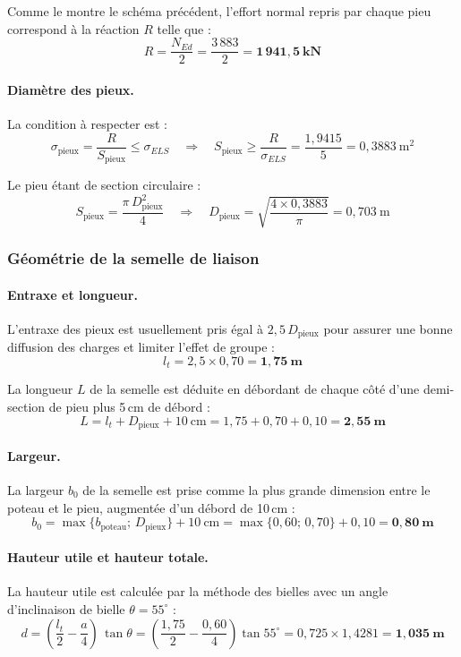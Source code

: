 Comme le montre le schéma précédent, l'effort normal repris par chaque pieu correspond à la réaction $R$ telle que :
\[
  R = \frac{N_{Ed}}{2} = \frac{3\,883}{2} = \mathbf{1\,941{,}5~\text{kN}}
\]

\paragraph{Diamètre des pieux.} La condition à respecter est :
\[
  \sigma_\text{pieux} = \frac{R}{S_\text{pieux}} \leq \sigma_{ELS}
  \quad\Longrightarrow\quad
  S_\text{pieux} \geq \frac{R}{\sigma_{ELS}} = \frac{1{,}9415}{5} = 0{,}3883~\text{m}^2
\]

Le pieu étant de section circulaire :
\[
  S_\text{pieux} = \frac{\pi\,D_\text{pieux}^{2}}{4}
  \quad\Longrightarrow\quad
  D_\text{pieux} = \sqrt{\frac{4 \times 0{,}3883}{\pi}} = 0{,}703~\text{m}
\]


\subsubsection{Géométrie de la semelle de liaison}

\paragraph{Entraxe et longueur.} L'entraxe des pieux est usuellement pris égal à $2{,}5\,D_\text{pieux}$ pour assurer une bonne diffusion des charges et limiter l'effet de groupe :
\[
  l_t = 2{,}5 \times 0{,}70 = \mathbf{1{,}75~\text{m}}
\]

La longueur $L$ de la semelle est déduite en débordant de chaque côté d'une demi-section de pieu plus 5\,cm de débord :
\[
  L = l_t + D_\text{pieux} + 10~\text{cm} = 1{,}75 + 0{,}70 + 0{,}10 = \mathbf{2{,}55~\text{m}}
\]

\paragraph{Largeur.} La largeur $b_0$ de la semelle est prise comme la plus grande dimension entre le poteau et le pieu, augmentée d'un débord de 10\,cm :
\[
  b_0 = \max\{b_\text{poteau} ;\, D_\text{pieux}\} + 10~\text{cm} = \max\{0{,}60 ;\, 0{,}70\} + 0{,}10 = \mathbf{0{,}80~\text{m}}
\]

\paragraph{Hauteur utile et hauteur totale.} La hauteur utile est calculée par la méthode des bielles avec un angle d'inclinaison de bielle $\theta = 55^\circ$ :
\[
  d = \left(\frac{l_t}{2} - \frac{a}{4}\right)\,\tan\theta
    = \left(\frac{1{,}75}{2} - \frac{0{,}60}{4}\right) \tan 55^\circ
    = 0{,}725 \times 1{,}4281 = \mathbf{1{,}035~\text{m}}
\]

